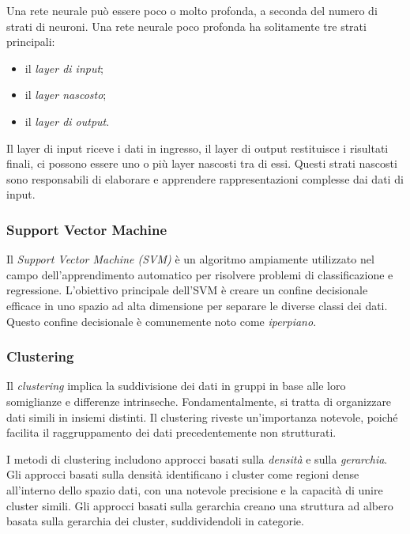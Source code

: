 Una rete neurale può essere poco o molto profonda, a seconda del numero di strati di neuroni. Una rete neurale poco profonda ha solitamente tre strati principali: 

\begin{itemize}
    \item il \textit{layer di input};
    \item il \textit{layer nascosto};
    \item il \textit{layer di output}.
\end{itemize}

Il layer di input riceve i dati in ingresso, il layer di output restituisce i risultati finali, ci possono essere uno o più layer nascosti tra di essi. Questi strati nascosti sono responsabili di elaborare e apprendere rappresentazioni complesse dai dati di input.

\subsubsection{Support Vector Machine}

Il \textit{Support Vector Machine (SVM)} è un algoritmo ampiamente utilizzato nel campo dell'apprendimento automatico per risolvere problemi di classificazione e regressione. L'obiettivo principale dell'SVM è creare un confine decisionale efficace in uno spazio ad alta dimensione per separare le diverse classi dei dati. Questo confine decisionale è comunemente noto come \textit{iperpiano}.

\subsubsection{Clustering}

Il \textit{clustering} implica la suddivisione dei dati in gruppi in base alle loro somiglianze e differenze intrinseche. Fondamentalmente, si tratta di organizzare dati simili in insiemi distinti. Il clustering riveste un'importanza notevole, poiché facilita il raggruppamento dei dati precedentemente non strutturati. 

I metodi di clustering includono approcci basati sulla \textit{densità} e sulla \textit{gerarchia}. Gli approcci basati sulla densità identificano i cluster come regioni dense all'interno dello spazio dati, con una notevole precisione e la capacità di unire cluster simili. Gli approcci basati sulla gerarchia creano una struttura ad albero basata sulla gerarchia dei cluster, suddividendoli in categorie.

